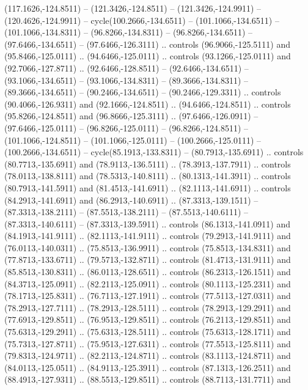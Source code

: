 \begin{scope}[cm={{1.25,0.0,0.0,-1.25,(0.0,442.91375)}}]
\begin{scope}[xscale=1.000,yscale=-1.000,fill=c545457,line join=miter,line cap=butt,line width=0.800pt]
      (117.1626,-124.8511) -- (121.3426,-124.8511) -- (121.3426,-124.9911) --
      (120.4626,-124.9911) -- cycle(100.2666,-134.6511) -- (101.1066,-134.6511) --
      (101.1066,-134.8311) -- (96.8266,-134.8311) -- (96.8266,-134.6511) --
      (97.6466,-134.6511) -- (97.6466,-126.3111) .. controls (96.9066,-125.5111) and
      (95.8466,-125.0111) .. (94.6466,-125.0111) .. controls (93.1266,-125.0111) and
      (92.7066,-127.8711) .. (92.6466,-128.8511) -- (92.6466,-134.6511) --
      (93.1066,-134.6511) -- (93.1066,-134.8311) -- (89.3666,-134.8311) --
      (89.3666,-134.6511) -- (90.2466,-134.6511) -- (90.2466,-129.3311) .. controls
      (90.4066,-126.9311) and (92.1666,-124.8511) .. (94.6466,-124.8511) .. controls
      (95.8266,-124.8511) and (96.8666,-125.3111) .. (97.6466,-126.0911) --
      (97.6466,-125.0111) -- (96.8266,-125.0111) -- (96.8266,-124.8511) --
      (101.1066,-124.8511) -- (101.1066,-125.0111) -- (100.2666,-125.0111) --
      (100.2666,-134.6511) -- cycle(85.1913,-133.8311) -- (80.7913,-135.6911) ..
      controls (80.7713,-135.6911) and (78.9113,-136.5111) .. (78.3913,-137.7911) ..
      controls (78.0113,-138.8111) and (78.5313,-140.8111) .. (80.1313,-141.3911) ..
      controls (80.7913,-141.5911) and (81.4513,-141.6911) .. (82.1113,-141.6911) ..
      controls (84.2913,-141.6911) and (86.2913,-140.6911) .. (87.3313,-139.1511) --
      (87.3313,-138.2111) -- (87.5513,-138.2111) -- (87.5513,-140.6111) --
      (87.3313,-140.6111) -- (87.3313,-139.5911) .. controls (86.1313,-141.0911) and
      (84.1913,-141.9111) .. (82.1113,-141.9111) .. controls (79.2913,-141.9111) and
      (76.0113,-140.0311) .. (75.8513,-136.9911) .. controls (75.8513,-134.8311) and
      (77.8713,-133.6711) .. (79.5713,-132.8711) .. controls (81.4713,-131.9111) and
      (85.8513,-130.8311) .. (86.0113,-128.6511) .. controls (86.2313,-126.1511) and
      (84.3713,-125.0911) .. (82.2113,-125.0911) .. controls (80.1113,-125.2311) and
      (78.1713,-125.8311) .. (76.7113,-127.1911) .. controls (77.5113,-127.0311) and
      (78.2913,-127.7111) .. (78.2913,-128.5111) .. controls (78.2913,-129.2911) and
      (77.6913,-129.8511) .. (76.9513,-129.8511) .. controls (76.2113,-129.8511) and
      (75.6313,-129.2911) .. (75.6313,-128.5111) .. controls (75.6313,-128.1711) and
      (75.7313,-127.8711) .. (75.9513,-127.6311) .. controls (77.5513,-125.8111) and
      (79.8313,-124.9711) .. (82.2113,-124.8711) .. controls (83.1113,-124.8711) and
      (84.0113,-125.0511) .. (84.9113,-125.3911) .. controls (87.1313,-126.2511) and
      (88.4913,-127.9311) .. (88.5513,-129.8511) .. controls (88.7113,-131.7711) and

\end{scope}
\end{scope}
